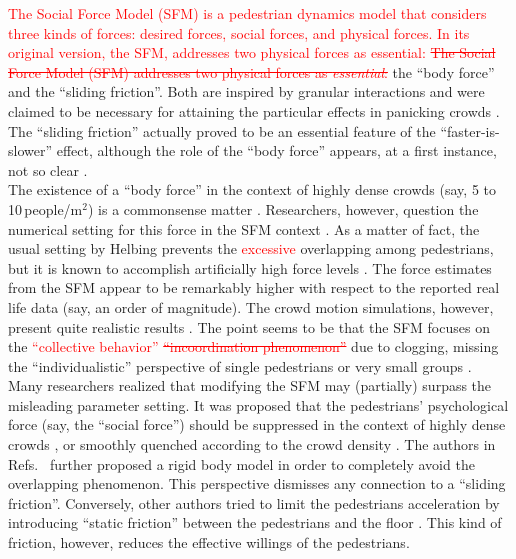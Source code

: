 \documentclass[preprint,12pt]{elsarticle}
\begin{document}
\textcolor{red}{The Social Force Model (SFM) is a pedestrian dynamics model that
considers three kinds of forces: desired forces, social forces, and physical forces.
In its original version, the SFM, addresses two physical forces as essential: 
\sout{The Social Force Model (SFM) addresses two physical forces as 
\textit{essential}:}} the ``body force'' and the ``sliding friction''. Both are 
inspired by granular interactions and were claimed to be necessary  
for attaining the particular effects in panicking crowds \cite{helbing_2000}. 
The ``sliding friction'' actually proved to be an essential feature of the 
``faster-is-slower'' effect, although the role of the ``body force'' appears, 
at a first instance, not so clear \cite{dorso_2005,dorso_2007,dorso_2011}. \\ 

The existence of a ``body force'' in the context of highly dense crowds (say, 5 
to 10$\,$people/m$^2$) is a commonsense matter \cite{henein_2007,fruin_1993}. 
Researchers, however, question the numerical setting for this force in 
the SFM context \cite{lakoba_2005}. As a matter of fact, the usual setting by 
Helbing prevents the \textcolor{red}{excessive} overlapping among pedestrians, but it is known to 
accomplish artificially high force levels 
\cite{helbing_2000,lakoba_2005,langston_2006,lin_2017}. The force estimates 
from the SFM appear to be remarkably higher with respect to the reported real 
life data (say, an order of magnitude). The crowd motion simulations, however, 
present quite realistic results \cite{lakoba_2005,langston_2006,dorso_2017}. 
The 
point seems to be that the SFM focuses on the \textcolor{red}{``collective behavior''
 \sout{``incoordination phenomenon''}} due 
to clogging, missing the ``individualistic'' perspective  of single pedestrians 
or very small groups \cite{helbing_2000,henein_2007,narain_2009}.  \\ 

Many researchers realized that modifying the SFM may (partially) surpass the 
misleading parameter setting. It was proposed that the pedestrians' 
psychological force (say, the ``social force'') should be suppressed in the 
context of highly dense crowds 
\cite{pelechano_2007,moussaid_2011,alonso_2014,bottinelli_2017}, or smoothly 
quenched according to the crowd density \cite{song_2019}. The authors in 
Refs.~\cite{kabalan_2017,jebrane_2019} further proposed a rigid body model in 
order to completely avoid the overlapping phenomenon. This perspective 
dismisses 
any connection to a ``sliding friction''. Conversely, other authors tried to 
limit the pedestrians acceleration by introducing ``static friction'' between 
the pedestrians and the floor \cite{wang_2019}. This kind of friction, however, 
reduces the effective willings of the pedestrians.  \\  
\end{document}

